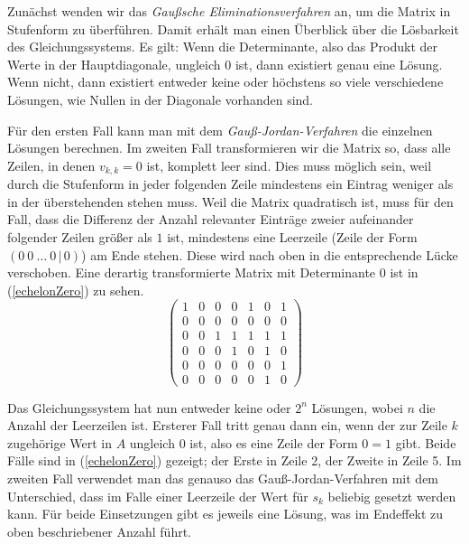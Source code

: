 \documentclass{scrartcl}
\begin{document}
Zunächst wenden wir das \emph{Gaußsche Eliminationsverfahren} an, um die
Matrix in Stufenform zu überführen. Damit erhält man einen Überblick über die
Lösbarkeit des Gleichungssystems. Es gilt: Wenn die Determinante, also das
Produkt der Werte in der Hauptdiagonale, ungleich $0$ ist, dann existiert genau
eine Lösung. Wenn nicht, dann existiert entweder keine oder höchstens so viele
verschiedene Lösungen, wie Nullen in der Diagonale vorhanden sind.

Für den ersten Fall kann man mit dem \emph{Gauß-Jordan-Verfahren} die einzelnen
Lösungen berechnen. Im zweiten Fall transformieren wir die Matrix so, dass alle
Zeilen, in denen $v_{k,k} = 0$ ist, komplett leer sind. Dies muss möglich sein,
weil durch die Stufenform in jeder folgenden Zeile mindestens ein Eintrag
weniger als in der überstehenden stehen muss. Weil die Matrix quadratisch ist,
muss für den Fall, dass die Differenz der Anzahl relevanter Einträge zweier
aufeinander folgender Zeilen größer als $1$ ist, mindestens eine Leerzeile 
(Zeile der Form $(0\ 0\ \dots\ 0\,|\,0)$) am Ende stehen. Diese wird nach oben
in die entsprechende Lücke verschoben. Eine derartig transformierte Matrix mit
Determinante $0$ ist in (\ref{echelonZero}) zu sehen.
\begin{equation}
\left(\begin{array}{cccccc|c}
  1&0&0&0&1&0&1\\
  0&0&0&0&0&0&0\\
  0&0&1&1&1&1&1\\
  0&0&0&1&0&1&0\\
  0&0&0&0&0&0&1\\
  0&0&0&0&0&1&0
\end{array}\right)\label{echelonZero}
\end{equation}

Das Gleichungssystem hat nun entweder keine oder $2^n$ Lösungen, wobei $n$ die
Anzahl der Leerzeilen ist. Ersterer Fall tritt genau dann ein, wenn der zur
Zeile $k$ zugehörige Wert in $A$ ungleich $0$ ist, also es eine Zeile der Form
$0=1$ gibt. Beide Fälle sind in (\ref{echelonZero}) gezeigt; der Erste in Zeile
2, der Zweite in Zeile 5. Im zweiten Fall verwendet man das genauso das
Gauß-Jordan-Verfahren mit dem Unterschied, dass im Falle einer Leerzeile der
Wert für $s_k$ beliebig gesetzt werden kann. Für beide Einsetzungen gibt es
jeweils eine Lösung, was im Endeffekt zu oben beschriebener Anzahl führt.
\end{document}
